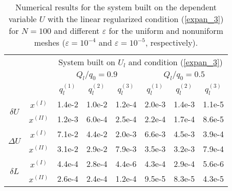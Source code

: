 \begin{table}
\centering
\begin{tabular}{c c|c@{}|c@{}|c@{}|c@{}|c@{}|c@{}|}
\cline{3-8}
& & \multicolumn{6}{c|}{System built on $U_l$ and condition (\ref{expan_3})}\\ \cline{3-8}
\cline{3-8}
& & \multicolumn{3}{c|}{$Q_l/q_0=0.9$} & \multicolumn{3}{c|}{$Q_l/q_0=0.5$} \\ \cline{3-8}
& & $q_l^{(1)}$ & $q_l^{(2)}$ & $q_l^{(3)}$ & $q_l^{(1)}$ & $q_l^{(2)}$ & $q_l^{(3)}$ \\ \cline{1-8}
\multicolumn{1}{|c}{\multirow{2}{*}{$\delta U$}} & \multicolumn{1}{|c|}{$x^{(I)}$}
 &1.4e-2&1.0e-2&1.2e-4&2.0e-3&1.4e-3&1.1e-5
 \\ \cline{2-8} \multicolumn{1}{|c}{} & \multicolumn{1}{|c|}{$x^{(II)}$}
&1.2e-3&6.0e-4&2.5e-4&2.2e-4&1.7e-4&8.6e-5
  \\ \cline{1-8} \multicolumn{1}{|c}{\multirow{2}{*}{$\Delta U$}} & \multicolumn{1}{|c|}{$x^{(I)}$}
&7.1e-2&4.4e-2&2.0e-3&6.6e-3&4.5e-3&3.9e-4
 \\ \cline{2-8} \multicolumn{1}{|c}{} & \multicolumn{1}{|c|}{$x^{(II)}$}
&3.1e-2&2.9e-2&7.9e-3&3.5e-3&3.2e-3&7.9e-4
  \\ \cline{1-8} \multicolumn{1}{|c}{\multirow{2}{*}{$\delta L$}} & \multicolumn{1}{|c|}{$x^{(I)}$}
&4.4e-4&2.8e-4&4.4e-6&4.3e-4&2.9e-4&5.6e-6
 \\ \cline{2-8} \multicolumn{1}{|c}{} & \multicolumn{1}{|c|}{$x^{(II)}$}
&2.6e-4&2.4e-4&1.2e-4&9.5e-5&8.3e-5&4.3e-5
 \\ \cline{1-8}
\end{tabular}
 \caption{Numerical results for the system built on the dependent variable $U$ with the linear regularized condition (\ref{expan_3}) for $N=100$ and different $\varepsilon$ for the uniform and nonuniform meshes ($\varepsilon=10^{-4}$ and $\varepsilon=10^{-5}$, respectively).}
\label{table_U_l}
\end{table}



